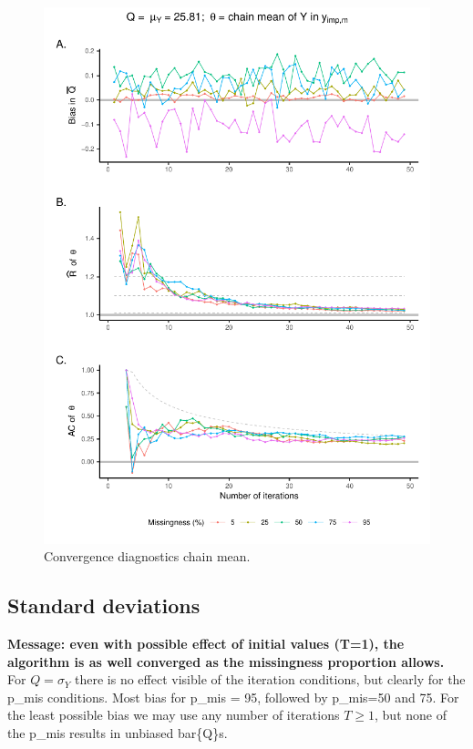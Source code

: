 \documentclass[Royal,times,sageh]{sagej}
\begin{document}
\begin{figure}

{\centering \includegraphics{manuscript_files/figure-latex/mean-1} 

}

\caption{Convergence diagnostics chain mean.}\label{fig:mean}
\end{figure}

\hypertarget{standard-deviations}{%
\subsection{Standard deviations}\label{standard-deviations}}

\textbf{Message: even with possible effect of initial values (T=1), the
algorithm is as well converged as the missingness proportion allows.}
For \(Q=\sigma_Y\) there is no effect visible of the iteration
conditions, but clearly for the p\_mis conditions. Most bias for p\_mis
= 95, followed by p\_mis=50 and 75. For the least possible bias we may
use any number of iterations \(T\geq1\), but none of the p\_mis results
in unbiased bar\{Q\}s.
\end{document}
